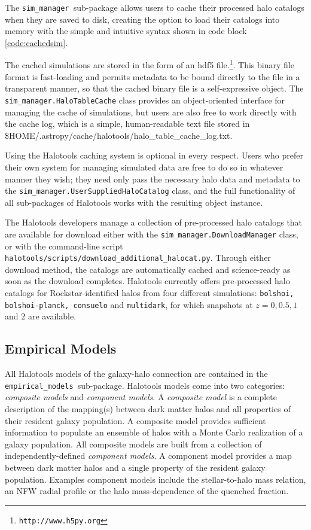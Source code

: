 \documentclass[twocolumn, tighten]{aastex6}
\newcommand{\emodels}{{\tt empirical\_models }}
\newcommand{\sims}{{\tt sim\_manager }}
\begin{document}
The \sims sub-package allows users to cache their processed halo catalogs when they are saved to disk, creating the option to load their catalogs into memory with the simple and intuitive syntax shown in code block \ref{code:cachedsim}. 

The cached simulations are stored in the form of an hdf5 file.\footnote{\tt http://www.h5py.org}\citep{hdf5}. This binary file format is fast-loading and permits metadata to be bound directly to the file in a transparent manner, so that the cached binary file is a self-expressive object. The {\tt sim\_manager.HaloTableCache} class provides an object-oriented interface for managing the cache of simulations, but users are also free to work directly with the cache log, which is a simple, human-readable text file stored in \$HOME/.astropy/cache/halotools/halo\_table\_cache\_log.txt.

Using the Halotools caching system is optional in every respect. Users who prefer their own system for managing simulated data are free to do so in whatever manner they wish; they need only pass the necessary halo data and metadata to the {\tt sim\_manager.UserSuppliedHaloCatalog} class, and the full functionality of all sub-packages of Halotools works with the resulting object instance.  

The Halotools developers manage a collection of pre-processed halo catalogs that are available for download either with the {\tt sim\_manager.DownloadManager} class, or with the command-line script {\tt halotools/scripts/download\_additional\_halocat.py}. Through either download method, the catalogs are automatically cached and science-ready as soon as the download completes. Halotools currently offers pre-processed halo catalogs for Rockstar-identified halos from four different simulations: {\tt bolshoi, bolshoi-planck, consuelo} and {\tt multidark}, for which snapshots at $z=0, 0.5, 1$ and $2$ are available.

\subsection{Empirical Models}
\label{subsection:empirical_models}

All Halotools models of the galaxy-halo connection are contained in the \emodels sub-package. Halotools models come into two categories: {\em composite models} and {\em component models}. 
A {\em composite model} is a complete description of the mapping(s) between dark matter halos and all properties of their resident galaxy population. A composite model provides sufficient information to populate an ensemble of halos with a Monte Carlo realization of a galaxy population. All composite models are built from a collection of independently-defined {\em component models}. A component model provides a map between dark matter halos and a single property of the resident galaxy population. Examples component models include the stellar-to-halo mass relation, an NFW radial profile or the halo mass-dependence of the quenched fraction.
\end{document}
